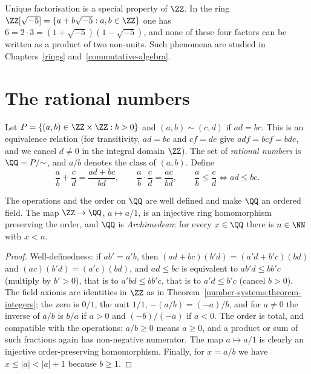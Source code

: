\begin{remark}\label{number-systems:remark-unique-factorisation-fails}
Unique factorisation is a special property of $\ZZ$. In the ring
$\ZZ[\sqrt{-5}] = \{a + b\sqrt{-5} : a, b \in \ZZ\}$ one has
$6 = 2 \cdot 3 = (1 + \sqrt{-5})(1 - \sqrt{-5})$, and none of these four factors
can be written as a product of two non-units. Such phenomena are studied in
Chapters~\ref{rings} and~\ref{commutative-algebra}.
\end{remark}

\section{The rational numbers}\label{number-systems:section-rationals}

\begin{definition}\label{number-systems:definition-rationals}
Let $P = \{(a, b) \in \ZZ \times \ZZ : b > 0\}$ and $(a, b) \sim (c, d)$ if
$ad = bc$. This is an equivalence relation (for transitivity, $ad = bc$ and
$cf = de$ give $adf = bcf = bde$, and we cancel $d \neq 0$ in the integral domain
$\ZZ$). The set of \emph{rational numbers} is $\QQ = P/{\sim}$, and $a/b$ denotes
the class of $(a, b)$. Define
\[
\frac{a}{b} + \frac{c}{d} = \frac{ad + bc}{bd}, \qquad
\frac{a}{b} \cdot \frac{c}{d} = \frac{ac}{bd}, \qquad
\frac{a}{b} \leq \frac{c}{d} \iff ad \leq bc.
\]
\end{definition}

\begin{theorem}\label{number-systems:theorem-rationals}
The operations and the order on $\QQ$ are well defined and make $\QQ$ an ordered
field. The map $\ZZ \to \QQ$, $a \mapsto a/1$, is an injective ring homomorphism
preserving the order, and $\QQ$ is \emph{Archimedean}: for every $x \in \QQ$
there is $n \in \NN$ with $x < n$.
\end{theorem}

\begin{proof}
Well-definedness: if $ab' = a'b$, then
$(ad + bc)(b'd) = (a'd + b'c)(bd)$ and $(ac)(b'd) = (a'c)(bd)$, and $ad \leq bc$
is equivalent to $ab'd \leq bb'c$ (multiply by $b' > 0$), that is to
$a'bd \leq bb'c$, that is to $a'd \leq b'c$ (cancel $b > 0$). The field axioms
are identities in $\ZZ$ as in Theorem~\ref{number-systems:theorem-integers};
the zero is $0/1$, the unit $1/1$, $-(a/b) = (-a)/b$, and for $a \neq 0$ the
inverse of $a/b$ is $b/a$ if $a > 0$ and $(-b)/(-a)$ if $a < 0$. The order is
total, and compatible with the operations: $a/b \geq 0$ means $a \geq 0$, and a
product or sum of such fractions again has non-negative numerator. The map
$a \mapsto a/1$ is clearly an injective order-preserving homomorphism. Finally,
for $x = a/b$ we have $x \leq |a| < |a| + 1$ because $b \geq 1$.
\end{proof}

